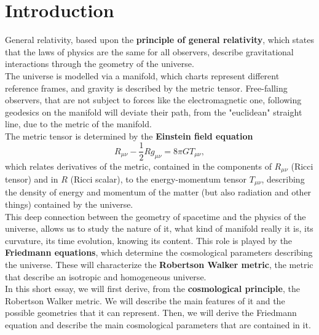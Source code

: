\section{Introduction}
General relativity, based upon the \textbf{principle of general relativity}, which states that the laws of physics are the same for all observers, describe gravitational interactions through the geometry of the universe. 
\\ The universe is modelled via a manifold, which charts represent different reference frames, and gravity is described by the metric tensor. Free-falling observers, that are not subject to forces like the electromagnetic one, following geodesics on the manifold will deviate their path, from the "euclidean" straight line, due to the metric of the manifold.\\ The metric tensor is determined by the \textbf{Einstein field equation} $$R_{\mu\nu}-\frac{1}{2}Rg_{\mu\nu}=8\pi GT_{\mu\nu},$$
which relates derivatives of the metric, contained in the components of $R_{\mu\nu}$ (Ricci tensor) and in $R$ (Ricci scalar), to the energy-momentum tensor $T_{\mu\nu}$, describing the density of energy and momentum of the matter (but also radiation and other things) contained by the universe.\\

This deep connection between the geometry of spacetime and the physics of the universe, allows us to study the nature of it, what kind of manifold really it is, its curvature, its time evolution, knowing its content. This role is played by the \textbf{Friedmann equations}, which determine the cosmological parameters describing the universe. These will characterize the \textbf{Robertson Walker metric}, the metric that describe an isotropic and homogeneous universe. \\

In this short essay, we will first derive, from the \textbf{cosmological principle}, the Robertson Walker metric. We will describe the main features of it and the possible geometries that it can represent. Then, we will derive the Friedmann equation and describe the main cosmological parameters that are contained in it.